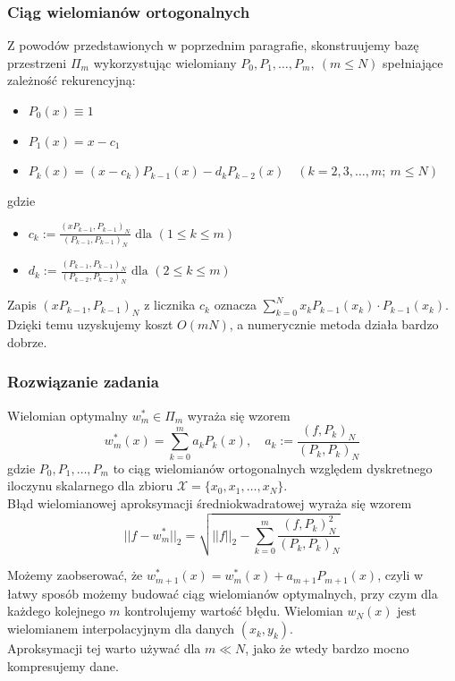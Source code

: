 \documentclass[a4paper,11pt]{article}
\begin{document}
\subsubsection{Ciąg wielomianów ortogonalnych}
Z powodów przedstawionych w poprzednim paragrafie, skonstruujemy bazę przestrzeni $\Pi_m$ wykorzystując wielomiany $P_0, P_1, \ldots, P_m, \ (m \leq N)$ spełniające zależność rekurencyjną:
\begin{itemize}
\item $P_0(x)\equiv 1$
\item $P_1(x) = x - c_1$
\item $P_k(x) = (x-c_k)P_{k-1}(x)-d_kP_{k-2}(x) \quad (k = 2,3,\ldots, m; \ m \leq N)$
\end{itemize}
\noindent gdzie 
\begin{itemize}
\item $c_k := \frac{(xP_{k-1}, P_{k-1})_N}{(P_{k-1}, P_{k-1})_N} \text{ dla } ( 1 \leq k \leq m)$
\item $d_k := \frac{(P_{k-1}, P_{k-1})_N}{(P_{k-2}, P_{k-2})_N} \text{ dla } (2 \leq k \leq m)$
\end{itemize}
\noindent Zapis $(xP_{k-1}, P_{k-1})_N$ z licznika $c_k$ oznacza $\sum\limits_{k=0}^{N} x_kP_{k-1}(x_k)\cdot P_{k-1}(x_k)$. \\
Dzięki temu uzyskujemy koszt $O(mN)$, a numerycznie metoda działa bardzo dobrze.

\subsubsection{Rozwiązanie zadania} 
Wielomian optymalny $w_m^* \in \Pi_m$ wyraża się wzorem
$$ w_m^*(x) = \sum\limits_{k=0}^{m} a_kP_k(x), \quad a_k := \frac{(f,P_k)_N}{(P_k, P_k)_N}$$
\noindent gdzie $P_0, P_1, \ldots, P_m$ to ciąg wielomianów ortogonalnych względem dyskretnego iloczynu skalarnego dla zbioru $\mathcal{X}=\{ x_0, x_1, \ldots, x_N\}$. \\
Błąd wielomianowej aproksymacji średniokwadratowej wyraża się wzorem
$$ ||f-w_m^*||_2 = \sqrt{||f||_2 - \sum\limits_{k=0}^{m} \frac{(f,P_k)_N^2}{(P_k, P_k)_N}} $$

\noindent Możemy zaobserować, że $w_{m+1}^*(x) = w_m^*(x) + a_{m+1}P_{m+1}(x)$, czyli w łatwy sposób możemy budować ciąg wielomianów optymalnych, przy czym dla każdego kolejnego $m$ kontrolujemy wartość błędu. Wielomian $w_N(x)$ jest wielomianem interpolacyjnym dla danych $(x_k, y_k)$. \\
Aproksymacji tej warto używać dla $m \ll N$, jako że wtedy bardzo mocno kompresujemy dane.
\end{document}
